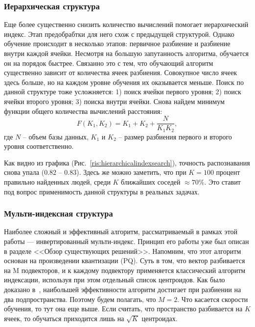 \subsubsection{Иерархическая структура}

Еще более существенно снизить количество вычислений помогает иерархический индекс. Этап предобрабтки для него схож с предыдущей структурой. Однако обучение происходит в несколько этапов: первичное разбиение и разбиение внутри каждой ячейки. Несмотря на большую запутанность алгоритма, обучается он на порядок быстрее. Связанно это с тем, что обучающий алгоритм существенно зависит от количества ячеек разбиения. Совокупное число ячеек здесь больше, но на каждом уровне обучения их оказывается меньше. Поиск по данной структуре тоже усложняется: 1) поиск ячейки первого уровня; 2) поиск ячейки второго уровня; 3) поиска внутри ячейки. Снова найдем минимум функции общего количества вычислений расстояния:
\begin{equation}\label{eq:hierachicalindex}
F(K_1,K_2)=K_1 + K_2 + \frac{N}{K_1K_2},
\end{equation}
где $N$ -- объем базы данных, $K_1$ и $K_2$ -- размер разбиения первого и второго уровня соответственно. 

Как видно из графика (Рис.~\ref{ris:hierarchicalindexsearch}), точность распознавания снова упала (0.82 -- 0.83). Здесь же можно заметить, что при $K = 100$ процент правильно найденных людей, среди $K$ ближайших соседей $\approx70\%$. Это ставит под вопрос применимость данной структуры в реальных задачах.

\subsubsection{Мульти-индексная структура}

Наиболее сложный и эффективный алгоритм, рассматриваемый в рамках этой работы — инвертированный мульти-индекс. Принцип его работы уже был описан в разделе <<Обзор существующих решений>>. Напомним, что этот алгоритм основан на произведении квантизации (PQ). Суть в том, что вектор разбивается на M подвекторов, и к каждому подвектору применяется классический алгоритм индексации, используя при этом отдельный список центроидов. Как было доказано в~\cite{3}, наибольшей эффективности алгоритм достигает при разбиении на два подпространства. Поэтому будем полагать, что $M = 2$. Что касается скорости обучения, то тут она еще выше. Если считать, что пространство разбивается на $K$ ячеек, то обучаться приходится лишь на $\sqrt{K}$ центроидах.

